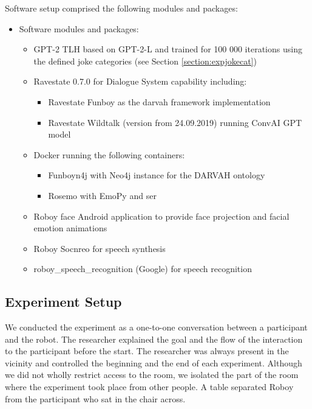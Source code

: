 Software setup comprised the following modules and packages:
\begin{itemize}
    \item Software modules and packages:
    \begin{itemize}
        \item GPT-2 TLH based on GPT-2-L and trained for 100 000 iterations using the defined joke categories (see Section \ref{section:expjokecat})
        \item Ravestate 0.7.0 for Dialogue System capability including:
        \begin{itemize}
            \item Ravestate Funboy as the \acrshort{darvah} framework implementation
            \item Ravestate Wildtalk (version from 24.09.2019) running ConvAI GPT model
        \end{itemize}
        \item Docker running the following containers:
        \begin{itemize}
            \item Funboyn4j with Neo4j instance for the DARVAH ontology
            \item Rosemo with EmoPy and \acrshort{ser}
        \end{itemize}
        \item Roboy face Android application to provide face projection and facial emotion animations
        \item Roboy Socnreo for speech synthesis
        \item roboy\_speech\_recognition (Google) for speech recognition
    \end{itemize}
\end{itemize}

\subsection{Experiment Setup}\label{subsection:expset}

We conducted the experiment as a one-to-one conversation between a participant and the robot. The researcher explained the goal and the flow of the interaction to the participant before the start. The researcher was always present in the vicinity and controlled the beginning and the end of each experiment. Although we did not wholly restrict access to the room, we isolated the part of the room where the experiment took place from other people. A table separated Roboy from the participant who sat in the chair across.

